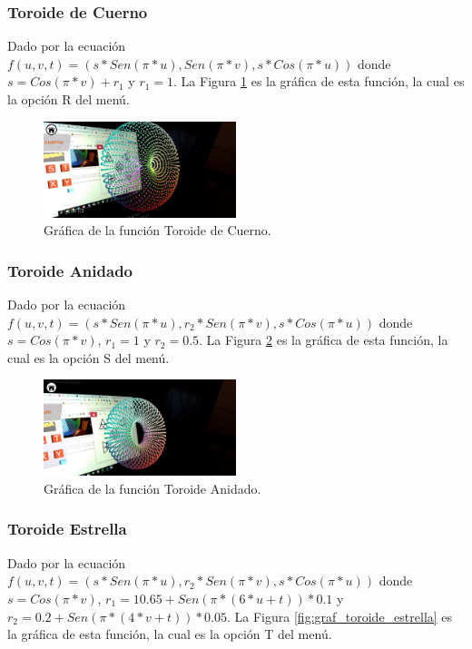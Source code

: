 \subsubsection{Toroide de Cuerno}
Dado por la ecuación $f(u,v,t)=(s*Sen(\pi * u), Sen(\pi *  v), s*Cos(\pi * u))$ donde $s = Cos(\pi * v)+r_1$ y $r_1 = 1$. La Figura \ref{fig:graf_toroide_cuerno} es la gráfica de esta función, la cual es la opción R del menú.

\begin{figure}[hbt!]
\centering
\includegraphics[width=0.5\textwidth]{figuras/graficas/toroide_cuerno.png}
\caption{\label{fig:graf_toroide_cuerno}Gráfica de la función Toroide de Cuerno.}
\end{figure}
\FloatBarrier

\subsubsection{Toroide Anidado}
Dado por la ecuación $f(u,v,t)=(s*Sen(\pi * u), r_2 * Sen(\pi *  v), s*Cos(\pi * u))$ donde $s = Cos(\pi * v)$, $r_1 = 1$ y $r_2 = 0.5$. La Figura \ref{fig:graf_toroide_anidado} es la gráfica de esta función, la cual es la opción S del menú.

\begin{figure}[hbt!]
\centering
\includegraphics[width=0.5\textwidth]{figuras/graficas/toroide_anidado.png}
\caption{\label{fig:graf_toroide_anidado}Gráfica de la función Toroide Anidado.}
\end{figure}
\FloatBarrier

\subsubsection{Toroide Estrella}
Dado por la ecuación $f(u,v,t)=(s*Sen(\pi * u), r_2 * Sen(\pi *  v), s*Cos(\pi * u))$ donde $s = Cos(\pi * v)$, $r_1 = 10.65 + Sen(\pi * (6 * u + t)) * 0.1$ y $r_2 = 0.2 + Sen(\pi * (4 * v + t)) * 0.05$. La Figura \ref{fig:graf_toroide_estrella} es la gráfica de esta función, la cual es la opción T del menú.

